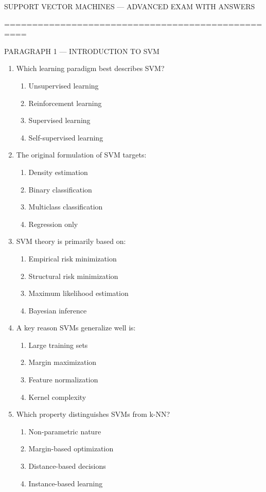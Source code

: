 \documentclass{article}
\begin{document}
	
	SUPPORT VECTOR MACHINES — ADVANCED EXAM WITH ANSWERS
	
	\bigskip
	==================================================
	
	PARAGRAPH 1 — INTRODUCTION TO SVM
	
	\begin{enumerate}
		\item Which learning paradigm best describes SVM?
		\begin{enumerate}
			\item Unsupervised learning
			\item Reinforcement learning
			\item Supervised learning
			\item Self-supervised learning
		\end{enumerate}
		
		\item The original formulation of SVM targets:
		\begin{enumerate}
			\item Density estimation
			\item Binary classification
			\item Multiclass classification
			\item Regression only
		\end{enumerate}
		
		\item SVM theory is primarily based on:
		\begin{enumerate}
			\item Empirical risk minimization
			\item Structural risk minimization
			\item Maximum likelihood estimation
			\item Bayesian inference
		\end{enumerate}
		
		\item A key reason SVMs generalize well is:
		\begin{enumerate}
			\item Large training sets
			\item Margin maximization
			\item Feature normalization
			\item Kernel complexity
		\end{enumerate}
		
		\item Which property distinguishes SVMs from k-NN?
		\begin{enumerate}
			\item Non-parametric nature
			\item Margin-based optimization
			\item Distance-based decisions
			\item Instance-based learning
		\end{enumerate}
		

\end{enumerate}
\end{document}
